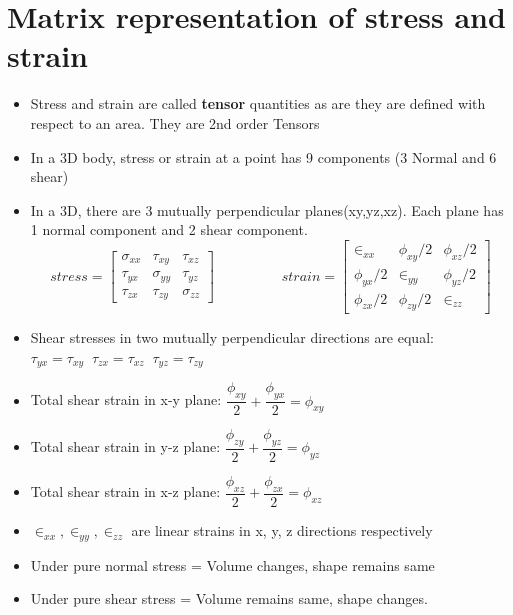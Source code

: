 \documentclass[8pt]{report}
\begin{document}
	\section{Matrix representation of stress and strain}
		\begin{itemize}
			\item Stress and strain are called \textbf{tensor} quantities as are they are defined with respect to an area. They are 2nd order Tensors
			\item In a 3D body, stress or strain at a point has 9 components (3 Normal and 6 shear)
			\item In a 3D, there are 3 mutually perpendicular planes(xy,yz,xz). Each plane has 1 normal component and 2 shear component. 
			\[ \boxed{stress = 
   	 	\left[
        \begin{array}{ccc}
         	\sigma_{xx} & \tau_{xy} & \tau_{xz}\\
         	\tau_{yx} & \sigma_{yy} & \tau_{yz}\\
         	\tau_{zx} & \tau_{zy} & \sigma_{zz}
       	\end{array}
    		\right]}\hspace{2cm}
    		\boxed{
    		strain = 
    		\left[
        \begin{array}{ccc}
         	\in_{xx} & \phi_{xy}/2 & \phi_{xz}/2\\
         	\phi_{yx}/2 & \in_{yy} & \phi_{yz}/2\\
         	\phi_{zx}/2 & \phi_{zy}/2 & \in_{zz}
       	\end{array}
    		\right]}
		\]
			\item Shear stresses in two mutually perpendicular directions are equal: $\tau_{yx} = \tau_{xy}\;\;\tau_{zx}=\tau_{xz}\;\;\tau_{yz}=\tau_{zy}$
			\item Total shear strain in x-y plane: $\dfrac{\phi_{xy}}{2} + \dfrac{\phi_{yx}}{2} = \phi_{xy}$
			\item Total shear strain in y-z plane: $\dfrac{\phi_{zy}}{2} + \dfrac{\phi_{yz}}{2} = \phi_{yz}$
			\item Total shear strain in x-z plane: $\dfrac{\phi_{xz}}{2} + \dfrac{\phi_{zx}}{2} = \phi_{xz}$
			\item $\in_{xx}, \in_{yy}, \in_{zz}$ are linear strains in x, y, z directions respectively
			\item Under pure normal stress = Volume changes, shape remains same
			\item Under pure shear stress = Volume remains same, shape changes.
		\end{itemize}\hrulefill
\end{document}
